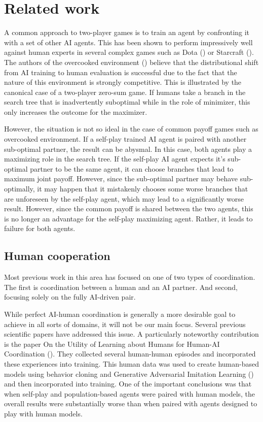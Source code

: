 \chapter{Related work}

A common approach to two-player games is to train an agent by confronting it with a set of other AI agents.
This has been shown to perform impressively well against human experts in several complex games such as Dota (\cite{DotaOpenFive}) or Starcraft (\cite{Starcraft}).
The authors of the overcooked environment (\cite{carroll2020utility}) believe that the distributional shift from AI training to human evaluation is successful due to the fact that the nature of this environment is strongly competitive.
This is illustrated by the canonical case of a two-player zero-sum game.
If humans take a branch in the search tree that is inadvertently suboptimal while in the role of minimizer, this only increases the outcome for the maximizer.

However, the situation is not so ideal in the case of common payoff games such as overcooked environment.
If a self-play trained AI agent is paired with another sub-optimal partner, the result can be abysmal. 
In this case, both agents play a maximizing role in the search tree. 
If the self-play AI agent expects it's sub-optimal partner to be the same agent, it can choose branches that lead to maximum joint payoff.
However, since the sub-optimal partner may behave sub-optimally, it may happen that it mistakenly chooses some worse branches that are unforeseen by the self-play agent, which may lead to a significantly worse result.
However, since the common payoff is shared between the two agents, this is no longer an advantage for the self-play maximizing agent.
Rather, it leads to failure for both agents.

\section{Human cooperation}
Most previous work in this area has focused on one of two types of coordination. 
The first is coordination between a human and an AI partner. 
And second, focusing solely on the fully AI-driven pair.


\par

While perfect AI-human coordination is generally a more desirable goal to achieve in all sorts of domains, it will not be our main focus.  
Several previous scientific papers have addressed this issue. A particularly noteworthy contribution is the paper 
On the Utility of Learning about Humans for Human-AI Coordination (\cite{carroll2020utility}). 
They collected several human-human episodes and incorporated these experiences into training.
This human data was used to create human-based models using behavior cloning and Generative Adversarial Imitation Learning (\cite{Ho2016GenerativeAI}) and then incorporated into training.
One of the important conclusions was that when self-play and population-based agents were paired with human models, the overall results were substantially worse than when paired with agents designed to play with human models.

